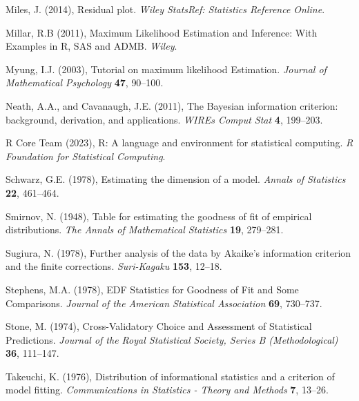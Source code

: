 \phantom{a}

\rff Miles, J. (2014),
      Residual plot.
      {\it Wiley StatsRef: Statistics Reference Online}.      

\phantom{a}

\rff Millar, R.B (2011),
      Maximum Likelihood Estimation and Inference: With Examples in R, SAS and ADMB.
      {\it Wiley}.      

\phantom{a}

\rff Myung, I.J. (2003),
      Tutorial on maximum likelihood Estimation.
      {\it Journal of Mathematical Psychology}
      {\bf 47}, {90--100}.      

\phantom{a}

\rff Neath, A.A., and Cavanaugh, J.E. (2011),
      The Bayesian information criterion: background, derivation, and applications.
      {\it WIREs Comput Stat}
      {\bf 4}, {199--203}.
      
\phantom{a}

\rff R Core Team (2023),
      R: A language and environment for statistical computing.
      {\it R Foundation for Statistical Computing}.

\phantom{a}

\rff Schwarz, G.E. (1978),
      Estimating the dimension of a model.
      {\it Annals of Statistics}
      {\bf 22}, {461--464}.

\phantom{a}

\rff Smirnov, N. (1948),
    Table for estimating the goodness of fit of empirical distributions.
    {\it The Annals of Mathematical Statistics}
    {\bf 19}, {279--281}.

\phantom{a}

\rff Sugiura, N. (1978),
      Further analysis of the data by Akaike's information criterion and the finite corrections.
      {\it Suri-Kagaku}
      {\bf 153}, {12--18}.

\phantom{a}

\rff Stephens, M.A. (1978),
      EDF Statistics for Goodness of Fit and Some Comparisons.
      {\it Journal of the American Statistical Association}
      {\bf 69}, {730--737}.

\phantom{a}

\rff Stone, M. (1974),
      Cross-Validatory Choice and Assessment of Statistical Predictions.
      {\it Journal of the Royal Statistical Society, Series B (Methodological)}
      {\bf 36}, {111--147}.

\phantom{a}

\rff Takeuchi, K. (1976),
      Distribution of informational statistics and a criterion of model fitting.
      {\it Communications in Statistics - Theory and Methods}
      {\bf 7}, {13--26}.

